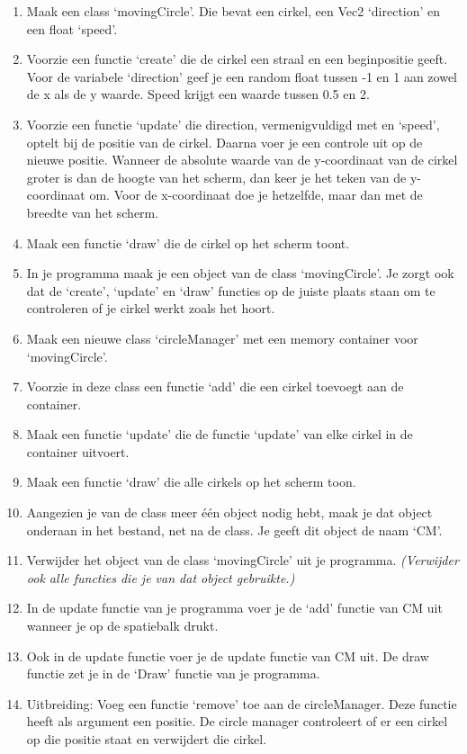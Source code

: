\begin{exercise}
\begin{enumerate}
\item Maak een class `movingCircle'. Die bevat een cirkel, een Vec2 `direction' en een float `speed'. 
\item Voorzie een functie `create' die de cirkel een straal en een beginpositie geeft. Voor de variabele `direction' geef je een random float tussen -1 en 1 aan zowel de x als de y waarde. Speed krijgt een waarde tussen 0.5 en 2.
\item Voorzie een functie `update' die direction, vermenigvuldigd met  en `speed', optelt bij de positie van de cirkel. Daarna voer je een controle uit op de nieuwe positie. Wanneer de absolute waarde van de y-coordinaat van de cirkel groter is dan de hoogte van het scherm, dan keer je het teken van de y-coordinaat om. Voor de x-coordinaat doe je hetzelfde, maar dan met de breedte van het scherm.
\item Maak een functie `draw' die de cirkel op het scherm toont. 
\item In je programma maak je een object van de class `movingCircle'. Je zorgt ook dat de `create', `update' en `draw' functies op de juiste plaats staan om te controleren of je cirkel werkt zoals het hoort.

\item Maak een nieuwe class `circleManager' met een memory container voor `movingCircle'.
\item Voorzie in deze class een functie `add' die een cirkel toevoegt aan de container.
\item Maak een functie `update' die de functie `update' van elke cirkel in de container uitvoert.
\item Maak een functie `draw' die alle cirkels op het scherm toon.
\item Aangezien je van de class meer \'e\'en object nodig hebt, maak je dat object onderaan in het bestand, net na de class. Je geeft dit object de naam `CM'.

\item Verwijder het object van de class `movingCircle' uit je programma. \textsl{(Verwijder ook alle functies die je van dat object gebruikte.)}
\item In de update functie van je programma voer je de `add' functie van CM uit wanneer je op de spatiebalk drukt.
\item Ook in de update functie voer je de update functie van CM uit. De draw functie zet je in de `Draw' functie van je programma.

\item Uitbreiding: Voeg een functie `remove' toe aan de circleManager. Deze functie heeft als argument een positie. De circle manager controleert of er een cirkel op die positie staat en verwijdert die cirkel.
\end{enumerate}
\end{exercise}

